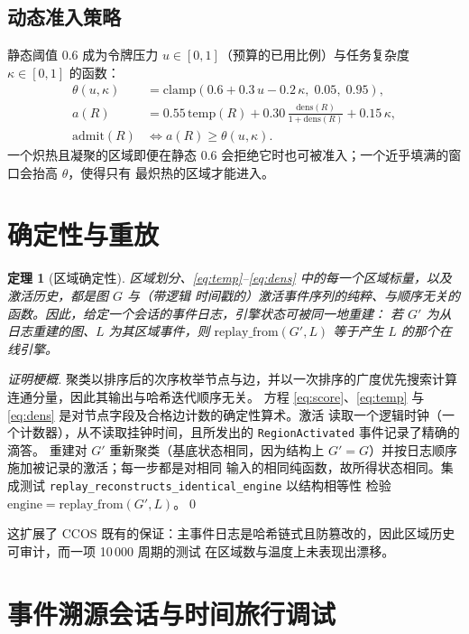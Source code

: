 \documentclass[11pt]{ctexart}
\newtheorem{theorem}{定理}
\newcommand{\code}[1]{\texttt{#1}}
\begin{document}
\subsection{动态准入策略}\label{sec:policy}

静态阈值 $0.6$ 成为令牌压力 $u\in[0,1]$（预算的已用比例）与任务复杂度 $\kappa\in[0,1]$ 的函数：
\begin{align}
\theta(u,\kappa)       &= \mathrm{clamp}(0.6 + 0.3\,u - 0.2\,\kappa,\; 0.05,\; 0.95), \\
a(R)                   &= 0.55\,\mathrm{temp}(R) + 0.30\,\frac{\mathrm{dens}(R)}{1+\mathrm{dens}(R)} + 0.15\,\kappa, \\
\mathrm{admit}(R)      &\iff a(R) \ge \theta(u,\kappa).
\end{align}
一个炽热且凝聚的区域即便在静态 $0.6$ 会拒绝它时也可被准入；一个近乎填满的窗口会抬高 $\theta$，使得只有
最炽热的区域才能进入。

\section{确定性与重放}\label{sec:determinism}

\begin{theorem}[区域确定性]
区域划分、\eqref{eq:temp}--\eqref{eq:dens} 中的每一个区域标量，以及激活历史，都是图 $G$ 与（带逻辑
时间戳的）激活事件序列的纯粹、与顺序无关的函数。因此，给定一个会话的事件日志，引擎状态可被同一地重建：
若 $G'$ 为从日志重建的图、$L$ 为其区域事件，则 $\mathrm{replay\_from}(G',L)$ 等于产生 $L$ 的那个在线引擎。
\end{theorem}
\begin{proof}[证明梗概]
聚类以排序后的次序枚举节点与边，并以一次排序的广度优先搜索计算连通分量，因此其输出与哈希迭代顺序无关。
方程 \eqref{eq:score}、\eqref{eq:temp} 与 \eqref{eq:dens} 是对节点字段及合格边计数的确定性算术。激活
读取一个逻辑时钟（一个计数器），从不读取挂钟时间，且所发出的 \code{RegionActivated} 事件记录了精确的滴答。
重建对 $G'$ 重新聚类（基底状态相同，因为结构上 $G'\!=\!G$）并按日志顺序施加被记录的激活；每一步都是对相同
输入的相同纯函数，故所得状态相同。集成测试 \code{replay\_reconstructs\_identical\_engine} 以结构相等性
检验 $\mathrm{engine}=\mathrm{replay\_from}(G',L)$。\qed
\end{proof}

这扩展了 CCOS 既有的保证：主事件日志是哈希链式且防篡改的，因此区域历史可审计，而一项 10\,000 周期的测试
在区域数与温度上未表现出漂移。

\section{事件溯源会话与时间旅行调试}\label{sec:timetravel}
\end{document}
